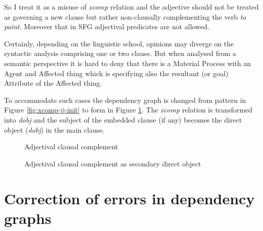 So I treat it as a misuse of \textit{xcomp} relation and the adjective should not be treated as governing a new clause but rather non-clausally complementing the verb \textit{to paint}. Moreover that in SFG adjectival predicates are not allowed.

Certainly, depending on the linguistic school, opinions may diverge on the syntactic analysis comprising one or two clause. But when analysed from a semantic perspective it is hard to deny that there is a Material Process with an Agent and Affected thing which is specifying also the resultant (or goal) Attribute of the Affected thing. 

To accommodate such cases the dependency graph is changed from pattern in Figure \ref{fig:xcomp-jj-init} to form in Figure \ref{fig:xcomp-jj-final}. The \textit{xcomp} relation is transformed into \textit{dobj} and the subject of the embedded clause (if any) becomes the direct object (\textit{dobj}) in the main clause.

\begin{figure}[!ht]
	\begin{minipage}{0.45\linewidth}
		\centering
		\caption{Adjectival clausal complement}
		\label{fig:xcomp-jj-init}
	\end{minipage}
	\quad
	\begin{minipage}{0.45\linewidth}
		\centering
		\caption{Adjectival clausal complement as secondary direct object}
		\label{fig:xcomp-jj-final}
	\end{minipage}
\end{figure}

\section{Correction of errors in dependency graphs}
\label{sec:preprocessing2}

